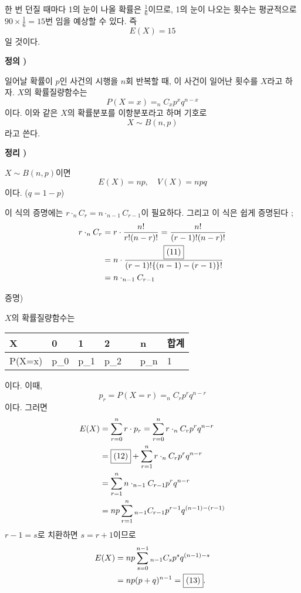 \documentclass[a4paper]{oblivoir}
\newcounter{num}
\newcommand\defi[1]
{\bigskip\par\noindent\stepcounter{num} \textbf{정의 \thenum) #1}\par\noindent}
\newcommand\theo[1]
{\bigskip\par\noindent\stepcounter{num} \textbf{정리 \thenum) #1}\par\noindent}
\newcommand{\proo}
{\bigskip\textsf{증명)}\par}
\let\emph\textsf
\begin{document}
한 번 던질 때마다 1의 눈이 나올 확률은 \(\frac16\)이므로, 1의 눈이 나오는 횟수는 평균적으로 \(90\times\frac16=15\)번 임을 예상할 수 있다.
즉 \[E(X)=15\]일 것이다.

%
\begin{mdframed}
\defi{}
일어날 확률이 \(p\)인 사건의 시행을 \(n\)회 반복할 때, 이 사건이 일어난 횟수를 \(X\)라고 하자.
\(X\)의 확률질량함수는
\[P(X=x)=_nC_xp^xq^{n-x}\]
이다.
이와 같은 \(X\)의 확률분포를 \emph{이항분포}라고 하며 기호로
\[X\sim B(n,p)\]
라고 쓴다.
\end{mdframed}

%
\begin{mdframed}
\theo{}
\(X\sim B(n,p)\)이면 
\[E(X)=np,\quad V(X)=npq\]
이다.
(\(q=1-p\))
\end{mdframed}

이 식의 증명에는 \(r\cdot_nC_r=n\cdot_{n-1}C_{r-1}\)이 필요하다.
그리고 이 식은 쉽게 증명된다 ;
\begin{align*}
r\cdot_nC_r
&=r\cdot\frac{n!}{r!(n-r)!}=\frac{n!}{(r-1)!(n-r)!}\\
&=n\cdot\frac{\fbox{(11)}}{(r-1)!\{(n-1)-(r-1)\}!}\\
&=n\cdot_{n-1}C_{r-1}
\end{align*}

\proo{}
\(X\)의 확률질량함수는
\begin{center}
\begin{tabu}to.8\textwidth{X[3$c]|X[$c]X[$c]X[$c]X[$c]X[$c]|X[$c]}
\hline
X		&0		&1		&2		&\cdots		&n	&합계\\\hline
P(X=x)	&p_0	&p_1	&p_2	&\cdots		&p_n	&1\\\hline
\end{tabu}
\end{center}
이다.
이때,
\[p_r=P(X=r)=_nC_rp^rq^{n-r}\]이다.
그러면
\begin{align*}
E(X)
&=\sum_{r=0}^nr\cdot p_r=\sum_{r=0}^nr\cdot_nC_rp^rq^{n-r}\\
&=\fbox{(12)}+\sum_{r=1}^nr\cdot_nC_rp^rq^{n-r}\\
&=\sum_{r=1}^nn\cdot_{n-1}C_{r-1}p^rq^{n-r}\\
&=np\sum_{r=1}^n{}_{n-1}C_{r-1}p^{r-1}q^{(n-1)-(r-1)}
\end{align*}
\(r-1=s\)로 치환하면 \(s=r+1\)이므로
\begin{align*}
E(X)
&=np\sum_{s=0}^{n-1}{}_{n-1}C_sp^sq^{(n-1)-s}\\
&=np(p+q)^{n-1}=\fbox{(13)}.
\end{align*}
\end{document}
